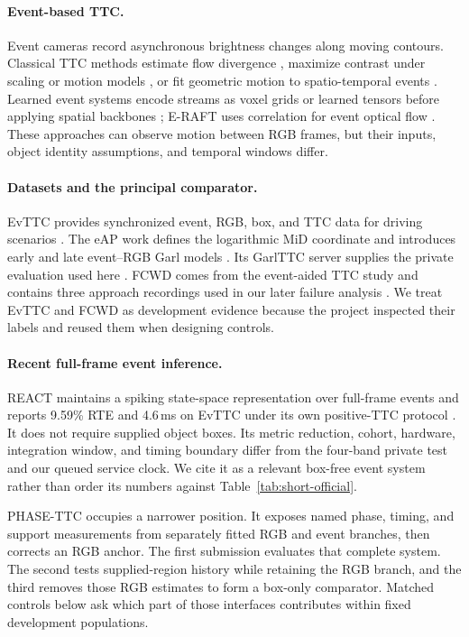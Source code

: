 \paragraph{Event-based TTC.} Event cameras record asynchronous brightness changes along moving contours. Classical TTC methods estimate flow divergence \citep{clady2014}, maximize contrast under scaling or motion models \citep{gallego2018cmax,mcleod2022}, or fit geometric motion to spatio-temporal events \citep{eventaided}. Learned event systems encode streams as voxel grids or learned tensors before applying spatial backbones \citep{zhu2019voxel,gehrig2019est}; E-RAFT uses correlation for event optical flow \citep{gehrig2021eraft}. These approaches can observe motion between RGB frames, but their inputs, object identity assumptions, and temporal windows differ.

\paragraph{Datasets and the principal comparator.} EvTTC provides synchronized event, RGB, box, and TTC data for driving scenarios \citep{evttc}. The eAP work defines the logarithmic MiD coordinate and introduces early and late event--RGB Garl models \citep{eap}. Its GarlTTC server supplies the private evaluation used here \citep{codabench2026,garlscorer2026}. FCWD comes from the event-aided TTC study and contains three approach recordings used in our later failure analysis \citep{eventaided}. We treat EvTTC and FCWD as development evidence because the project inspected their labels and reused them when designing controls.

\paragraph{Recent full-frame event inference.} REACT maintains a spiking state-space representation over full-frame events and reports 9.59\% RTE and 4.6\,ms on EvTTC under its own positive-TTC protocol \citep{react2026}. It does not require supplied object boxes. Its metric reduction, cohort, hardware, integration window, and timing boundary differ from the four-band private test and our queued service clock. We cite it as a relevant box-free event system rather than order its numbers against Table~\ref{tab:short-official}.

PHASE-TTC occupies a narrower position. It exposes named phase, timing, and support measurements from separately fitted RGB and event branches, then corrects an RGB anchor. The first submission evaluates that complete system. The second tests supplied-region history while retaining the RGB branch, and the third removes those RGB estimates to form a box-only comparator. Matched controls below ask which part of those interfaces contributes within fixed development populations.

